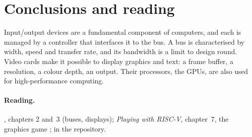 \section{Conclusions and reading}

Input/output devices are a fundamental component of computers, and each is
managed by a controller that interfaces it to the bus. A bus is characterised
by width, speed and transfer rate, and its bandwidth is a limit to design
round. Video cards make it possible to display graphics and text: a frame
buffer, a resolution, a colour depth, an output. Their processors, the GPUs,
are also used for high-performance computing.

\paragraph{Reading.} \citet{tanenbaum2013}, chapters 2 and~3 (buses,
displays); \emph{Playing with RISC-V}, chapter~7, the graphics game
\citep{prg32textbook};  in the \prg
repository.
